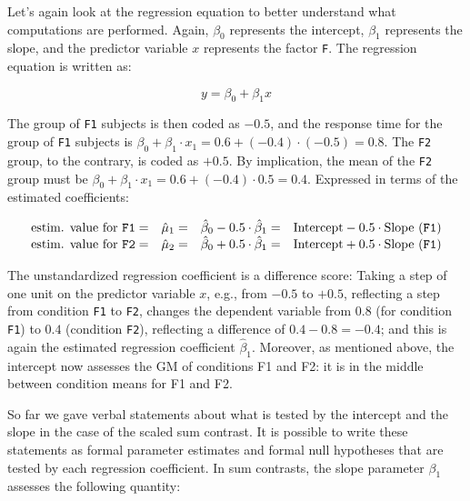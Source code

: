 \documentclass[12pt,]{krantz}
\theoremstyle{definition}
\theoremstyle{definition}
\theoremstyle{definition}
\theoremstyle{remark}
\begin{document}
Let's again look at the regression equation to better understand what computations are performed. Again, \(\beta_0\) represents the intercept, \(\beta_1\) represents the slope, and the predictor variable \(x\) represents the factor \texttt{F}. The regression equation is written as:

\begin{equation}
y = \beta_0 + \beta_1x
\label{eq:lm2}
\end{equation}

The group of \texttt{F1} subjects is then coded as \(-0.5\), and the response time for the group of \texttt{F1} subjects is \(\beta_0 + \beta_1 \cdot x_1 = 0.6 + (-0.4) \cdot (-0.5) = 0.8\). The \texttt{F2} group, to the contrary, is coded as \(+0.5\). By implication, the mean of the \texttt{F2} group must be \(\beta_0 + \beta_1 \cdot x_1 = 0.6 + (-0.4) \cdot 0.5 = 0.4\).
Expressed in terms of the estimated coefficients:

\begin{equation}
\begin{array}{lccll}
\text{estim. value for \texttt{F1}} = & \hat{\mu}_1 = & \hat{\beta}_0 - 0.5 \cdot \hat{\beta}_1 = & \text{Intercept} - 0.5 \cdot \text{Slope (\texttt{F1})}\\
\text{estim. value for \texttt{F2}} = & \hat{\mu}_2 = & \hat{\beta}_0 + 0.5 \cdot \hat{\beta}_1 = & \text{Intercept} + 0.5 \cdot \text{Slope (\texttt{F1})}
\end{array}
\label{eq:predVal2}
\end{equation}

The unstandardized regression coefficient is a difference score: Taking a step of one unit on the predictor variable \(x\), e.g., from \(-0.5\) to \(+0.5\), reflecting a step from condition \texttt{F1} to \texttt{F2}, changes the dependent variable from \(0.8\) (for condition \texttt{F1}) to \(0.4\) (condition \texttt{F2}), reflecting a difference of \(0.4 - 0.8 = -0.4\); and this is again the estimated regression coefficient \(\hat{\beta}_1\).
Moreover, as mentioned above, the intercept now assesses the GM of conditions F1 and F2: it is in the middle between condition means for F1 and F2.

So far we gave verbal statements about what is tested by the intercept and the slope in the case of the scaled sum contrast. It is possible to write these statements as formal parameter estimates and formal null hypotheses that are tested by each regression coefficient.
In sum contrasts, the slope parameter \(\beta_1\) assesses the following quantity:
\end{document}
